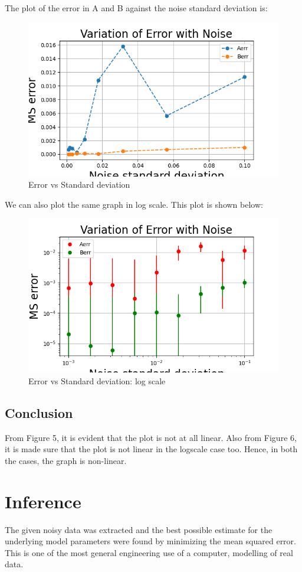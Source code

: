 \documentclass[11pt, a4paper]{article}
\begin{document}
The plot of the error in A and B against the noise standard deviation is:
	\begin{figure}[!tbh]
   	\centering
   	\includegraphics[scale=0.6]{Figure_3.png}   
   	\caption{Error vs Standard deviation}
   	\label{fig:sample}
   \end{figure} 

We can also plot the same graph in log scale. This plot is shown below:\\
 	\begin{figure}[!tbh]
   	\centering
   	\includegraphics[scale=0.6]{Figure_4.png}   
   	\caption{Error vs Standard deviation: log scale}
   	\label{fig:sample}
   \end{figure} 
\subsection*{Conclusion}
From Figure 5, it is evident that the plot is not at all linear. Also from Figure 6, it is made sure that the plot is not linear in the logscale case too. Hence, in both the cases, the graph is non-linear.

\section*{Inference}
The given noisy data was extracted and the best possible estimate for the
underlying model parameters were found by minimizing the mean squared
error. This is one of the most general engineering use of a computer, modelling of real data.
 
\end{document}
